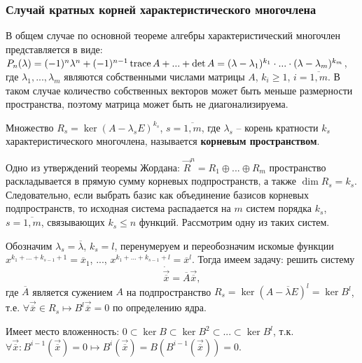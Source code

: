 \subsubsection*{Случай кратных корней характеристического многочлена}

В общем случае по основной теореме алгебры характеристический многочлен представляется в виде: 
$P_n (\lambda) = (-1)^n \lambda^n + (-1)^{n-1}\operatorname{trace} A + ... + \det A = (\lambda - \lambda_1)^{k_1} \cdot ... \cdot (\lambda - \lambda_m)^{k_m}$, 
где $\lambda_1, ..., \lambda_m$ являются собственными числами матрицы $A$, $k_i \geqslant 1$, $i = \overline{1, m}$. 
В таком случае количество собственных векторов может быть меньше размерности пространства, поэтому матрица может быть не диагонализируема.

\begin{definition}
  Множество $R_s = \ker (A - \lambda_s E)^{k_s}$, $s = \overline{1, m}$, где $\lambda_s$ -- корень кратности $k_s$ характеристического многочлена, называется \textbf{корневым пространством}.
\end{definition}

Одно из утверждений теоремы Жордана: $\overrightarrow{R}^n = R_1 \oplus ... \oplus R_m $ пространство раскладывается в прямую сумму корневых подпространств, а также $\dim R_s = k_s$.
Следовательно, если выбрать базис как объединение базисов корневых подпространств, то исходная система распадается на $m$ систем порядка $k_s$, $s = \overline{1, m}$, связывающих $k_s \leqslant n$ функций. Рассмотрим одну из таких систем.

Обозначим $\lambda_s = \overline{\lambda}$, $k_s = l$, перенумеруем и переобозначим искомые функции \\ $x^{k_1 + ... + k_{s-1} + 1} = \overline{x}_1$, ..., $x^{k_1 + ... + k_{s - 1} + l} = \overline{x}^l$.
Тогда имеем задачу: решить систему
\begin{equation}
  \dot{\overrightarrow{\overline{x}}} = \overline{A} \overrightarrow{\overline{x}},
\end{equation}
где $\overline{A}$ является сужением $A$ на подпространство $R_s = \ker (A - \overline{\lambda} E)^{l} = \ker B^l$, т.е. $\forall \overrightarrow{\overline{x}} \in R_s \mapsto B^l \overrightarrow{\overline{x}} = 0$ по определению ядра. 

Имеет место вложенность: $ 0 \subset \ker B \subset \ker B^2 \subset ... \subset \ker B^l$, 
т.к. $\forall \overrightarrow{\overline{x}}: B^{i-1}(\overrightarrow{\overline{x}}) = 0 \mapsto B^{i}(\overrightarrow{\overline{x}}) = B(B^{i-1}(\overrightarrow{\overline{x}})) = 0$.

